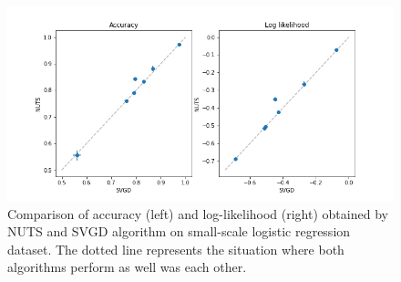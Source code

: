 \begin{figure}[h]
    \centering
    \includegraphics[width=\textwidth]{figs/logistic_svgd_nuts.png}
    \caption{Comparison of accuracy (left) and log-likelihood (right) obtained by NUTS and SVGD algorithm on small-scale logistic regression dataset. The dotted line represents the situation where both algorithms perform as well was each other.}
    \label{fig:logist_small}
\end{figure}